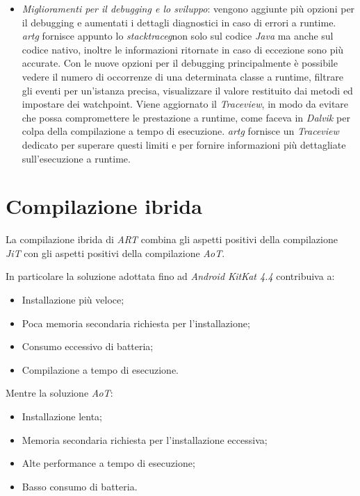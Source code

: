 \begin{itemize}
    \item \emph{Miglioramenti per il debugging e lo sviluppo}: vengono aggiunte più opzioni per il debugging e aumentati i dettagli diagnostici in caso di errori a runtime. \emph{\gls{artg}} fornisce appunto lo \emph{\gls{stacktraceg}}\glsfirstoccurspace non solo sul codice \emph{Java} ma anche sul codice nativo, inoltre le informazioni ritornate in caso di eccezione sono più accurate. Con le nuove opzioni per il debugging principalmente è possibile vedere il numero di occorrenze di una determinata classe a runtime, filtrare gli eventi per un'istanza precisa, visualizzare il valore restituito dai metodi ed impostare dei watchpoint. Viene aggiornato il \emph{Traceview}, in modo da evitare che possa compromettere le prestazione a runtime, come faceva in \emph{Dalvik} per colpa della compilazione a tempo di esecuzione. \emph{\gls{artg}}  fornisce un \emph{Traceview} dedicato per superare questi limiti e per fornire informazioni più dettagliate sull'esecuzione a runtime.
\end{itemize}

\section{Compilazione ibrida}
\label{sec:art_com_ibrid}

La compilazione ibrida di \emph{ART} combina gli aspetti positivi della compilazione \emph{JiT} con gli aspetti positivi della compilazione \emph{AoT}.

In particolare la soluzione adottata fino ad \emph{Android KitKat 4.4} contribuiva a:
\begin{itemize}
    \item Installazione più veloce;
    \item Poca memoria secondaria richiesta per l'installazione;
    \item Consumo eccessivo di batteria;
    \item Compilazione a tempo di esecuzione.
\end{itemize}
Mentre la soluzione \emph{AoT}:
\begin{itemize}
    \item Installazione lenta;
    \item Memoria secondaria richiesta per l'installazione eccessiva;
    \item Alte performance a tempo di esecuzione;
    \item Basso consumo di batteria.
\end{itemize}

